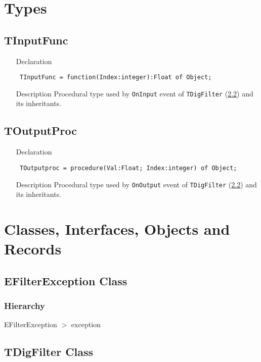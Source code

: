 \documentclass[12pt,a4paper,oneside]{report}
\newcommand{\declarationitem}[1]{{\addfontfeatures{FakeSlant} #1}}
\newcommand{\descriptiontitle}[1]{{\addfontfeatures{FakeSlant}#1}}
\newcommand{\code}[1]{\texttt{#1}}
\begin{document}
\section{Types}
\subsection{TInputFunc}
\label{lmfilters-TInputFunc}
\begin{itemize}
	\item[\declarationitem{Declaration}\hfill]
	\begin{flushleft}
		\code{
			TInputFunc = function(Index:integer):Float of Object;}
	\end{flushleft}
	\item[\descriptiontitle{Description}]
	Procedural type used by \code{OnInput} event of \code{TDigFilter} (\ref{lmfilters.TDigFilter}) and its inheritants.
\end{itemize}
\subsection{TOutputProc}
\label{lmfilters-TOutputproc}
\begin{itemize}\item[\declarationitem{Declaration}\hfill]
	\begin{flushleft}
		\code{
			TOutputproc = procedure(Val:Float; Index:integer) of Object;}
	\end{flushleft}
	\item[\descriptiontitle{Description}]
Procedural type used by \code{OnOutput} event of \code{TDigFilter} (\ref{lmfilters.TDigFilter}) and its inheritants.
\end{itemize}
\section{Classes, Interfaces, Objects and Records}
\subsection{EFilterException Class}
\label{lmfilters.EFilterException}
\subsubsection{Hierarchy}
EFilterException {$>$} exception
\subsection{TDigFilter Class}
\label{lmfilters.TDigFilter}
\end{document}
